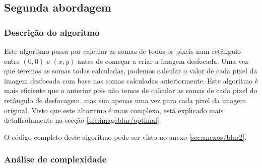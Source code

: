 \pagebreak

\subsection{Segunda abordagem}

\subsubsection{Descrição do algoritmo}

Este algoritmo passa por calcular as somas de todos os pixeis num retângulo entre $(0,0)$ e $(x,y)$ antes de começar a criar a imagem desfocada. Uma vez que teremos as somas todas calculadas, podemos calcular o valor de cada pixel da imagem desfocada com base nas somas calculadas anteriormente. Este algoritmo é mais eficiente que o anterior pois não temos de calcular as somas de cada pixel do retângulo de desfocagem, mas sim apenas uma vez para cada pixel da imagem original. Visto que este altoritmo é mais complexo, está explicado mais detalhadamente na secção \ref{sec:imageblur/optimal}.

O código completo deste algoritmo pode ser visto no anexo \ref{sec:anexos/blur2}.

\subsubsection{Análise de complexidade}

